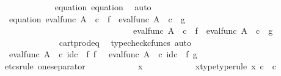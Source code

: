 \begin{isabellebody}
\ \ \ \ \ \ \ \ \ \ \isamarkupfalse%
\ equation{}\ equation{}\ \isamarkupfalse%
\ auto\isanewline
\ \ \ \ \ \ \ \ \isamarkupfalse%
\ \isamarkupfalse%
\ equation{}{\isacharcolon}{\kern0pt}\ {\isachardoublequoteopen}{\isacharparenleft}{\kern0pt}eval{\isacharunderscore}{\kern0pt}func\ A\ {\isasymOmega}\ {\isasymcirc}\isactrlsub c\ {\isasymlangle}{\isasymt}{\isacharcomma}{\kern0pt}\ f{\isasymrangle}\ {\isacharequal}{\kern0pt}\ eval{\isacharunderscore}{\kern0pt}func\ A\ {\isasymOmega}\ {\isasymcirc}\isactrlsub c\ {\isasymlangle}{\isasymt}{\isacharcomma}{\kern0pt}\ g{\isasymrangle}{\isacharparenright}{\kern0pt}\ {\isasymand}\ \isanewline
\ \ \ \ \ \ \ \ \ \ \ \ \ \ \ \ \ \ \ \ \ \ \ \ \ \ \ \ \ \ {\isacharparenleft}{\kern0pt}eval{\isacharunderscore}{\kern0pt}func\ A\ {\isasymOmega}\ {\isasymcirc}\isactrlsub c\ {\isasymlangle}{\isasymf}{\isacharcomma}{\kern0pt}\ f{\isasymrangle}\ {\isacharequal}{\kern0pt}\ eval{\isacharunderscore}{\kern0pt}func\ A\ {\isasymOmega}\ {\isasymcirc}\isactrlsub c\ {\isasymlangle}{\isasymf}{\isacharcomma}{\kern0pt}\ g{\isasymrangle}{\isacharparenright}{\kern0pt}{\isachardoublequoteclose}\isanewline
\ \ \ \ \ \ \ \ \ \ \isamarkupfalse%
\ \ cart{\isacharunderscore}{\kern0pt}prod{\isacharunderscore}{\kern0pt}eq{}\ \isamarkupfalse%
\ {\isacharparenleft}{\kern0pt}typecheck{\isacharunderscore}{\kern0pt}cfuncs{\isacharcomma}{\kern0pt}\ auto{\isacharparenright}{\kern0pt}\isanewline
\ \ \ \ \ \ \ \ \isamarkupfalse%
\ {\isachardoublequoteopen}eval{\isacharunderscore}{\kern0pt}func\ A\ {\isasymOmega}\ {\isasymcirc}\isactrlsub c\ id\isactrlsub c\ {\isasymOmega}\ {\isasymtimes}\isactrlsub f\ f\ \ {\isacharequal}{\kern0pt}\ eval{\isacharunderscore}{\kern0pt}func\ A\ {\isasymOmega}\ {\isasymcirc}\isactrlsub c\ id\isactrlsub c\ {\isasymOmega}\ {\isasymtimes}\isactrlsub f\ g{\isachardoublequoteclose}\isanewline
\ \ \ \ \ \ \ \ \isamarkupfalse%
{\isacharparenleft}{\kern0pt}etcs{\isacharunderscore}{\kern0pt}rule\ one{\isacharunderscore}{\kern0pt}separator{\isacharparenright}{\kern0pt}\isanewline
\ \ \ \ \ \ \ \ \ \ \isamarkupfalse%
\ x\isanewline
\ \ \ \ \ \ \ \ \ \ \isamarkupfalse%
\ x{\isacharunderscore}{\kern0pt}type{\isacharbrackleft}{\kern0pt}type{\isacharunderscore}{\kern0pt}rule{\isacharbrackright}{\kern0pt}{\isacharcolon}{\kern0pt}\ {\isachardoublequoteopen}x\ {\isasymin}\isactrlsub c\ {\isasymOmega}\ {\isasymtimes}\isactrlsub c\ {\isasymone}{\isachardoublequoteclose}\isanewline

\end{isabellebody}
